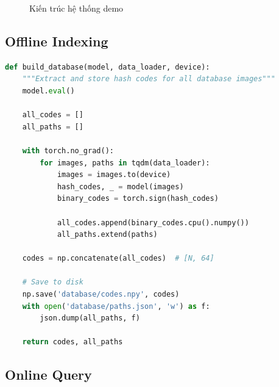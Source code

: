 \documentclass[12pt,a4paper]{article}
\begin{document}
\begin{figure}[H]
\centering
{}
\caption{Kiến trúc hệ thống demo}
\end{figure}

\subsection{Offline Indexing}

\begin{lstlisting}[caption={Build vector database},language=Python]
def build_database(model, data_loader, device):
    """Extract and store hash codes for all database images"""
    model.eval()
    
    all_codes = []
    all_paths = []
    
    with torch.no_grad():
        for images, paths in tqdm(data_loader):
            images = images.to(device)
            hash_codes, _ = model(images)
            binary_codes = torch.sign(hash_codes)
            
            all_codes.append(binary_codes.cpu().numpy())
            all_paths.extend(paths)
    
    codes = np.concatenate(all_codes)  # [N, 64]
    
    # Save to disk
    np.save('database/codes.npy', codes)
    with open('database/paths.json', 'w') as f:
        json.dump(all_paths, f)
    
    return codes, all_paths
\end{lstlisting}

\subsection{Online Query}
\end{document}
